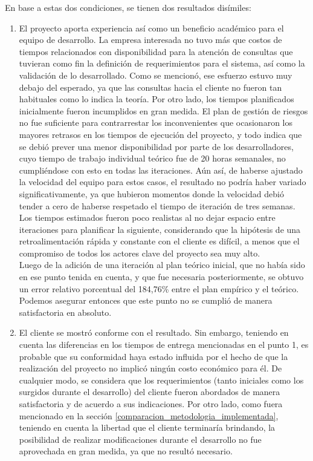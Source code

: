 \documentclass[a4paper, 12pt,twoside]{report}  %
\numberwithin{equation}{subsection} %
\begin{document}
En base a estas dos condiciones, se tienen dos resultados disímiles:
\begin{enumerate}
	\item El proyecto aporta experiencia así como un beneficio académico para el equipo de desarrollo. La empresa interesada no tuvo más que costos de tiempos relacionados con disponibilidad para la atención de consultas que tuvieran como fin la definición de requerimientos para el sistema, así como la validación de lo desarrollado. Como se mencionó, ese esfuerzo estuvo muy debajo del esperado, ya que las consultas hacia el cliente no fueron tan habituales como lo indica la teoría. Por otro lado, los tiempos planificados inicialmente fueron incumplidos en gran medida. El plan de gestión de riesgos no fue suficiente para contrarrestar los inconvenientes que ocasionaron los mayores retrasos en los tiempos de ejecución del proyecto, y todo indica que se debió prever una menor disponibilidad por parte de los desarrolladores, cuyo tiempo de trabajo individual teórico fue de 20 horas semanales, no cumpliéndose con esto en todas las iteraciones. Aún así, de haberse ajustado la velocidad del equipo para estos casos, el resultado no podría haber variado significativamente, ya que hubieron momentos donde la velocidad debió tender a cero de haberse respetado el tiempo de iteración de tres semanas.\\
	Los tiempos estimados fueron poco realistas al no dejar espacio entre iteraciones para planificar la siguiente, considerando que la hipótesis de una retroalimentación rápida y constante con el cliente es difícil, a menos que el compromiso de todos los actores clave del proyecto sea muy alto.\\
	Luego de la adición de una iteración al plan teórico inicial, que no había sido en ese punto tenida en cuenta, y que fue necesaria posteriormente, se obtuvo un error relativo porcentual del 184,76\% entre el plan empírico y el teórico.\\
	Podemos asegurar entonces que este punto no se cumplió de manera satisfactoria en absoluto.
	\item El cliente se mostró conforme con el resultado. Sin embargo, teniendo en cuenta las diferencias en los tiempos de entrega mencionadas en el punto 1, es probable que su conformidad haya estado influida por el hecho de que la realización del proyecto no implicó ningún costo económico para él. De cualquier modo, se considera que los requerimientos (tanto iniciales como los surgidos durante el desarrollo) del cliente fueron abordados de manera satisfactoria y de acuerdo a sus indicaciones. Por otro lado, como fuera mencionado en la sección \ref{comparacion_metodologia_implementada}, teniendo en cuenta la libertad que el cliente terminaría brindando, la posibilidad de realizar modificaciones durante el desarrollo no fue aprovechada en gran medida, ya que no resultó necesario.
\end{enumerate}
\end{document}
